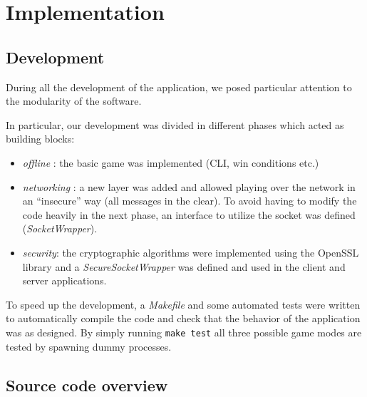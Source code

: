 \section{Implementation}

\subsection{Development}
During all the development of the application, we posed particular attention to the modularity of the software.

In particular, our development was divided in different phases which acted as building blocks:
\begin{itemize}
	\item \textit{offline} : the basic game was implemented (CLI, win conditions etc.)
	\item \textit{networking} : a new layer was added and allowed playing over the network in an ``insecure'' way (all messages in the clear). To avoid having to modify the code heavily in the next phase, an interface to utilize the socket was defined (\emph{SocketWrapper}).
	\item \textit{security}: the cryptographic algorithms were implemented using the OpenSSL library and a \emph{SecureSocketWrapper} was defined and used in the client and server applications.
\end{itemize}

To speed up the development, a \emph{Makefile} and some automated tests were written to automatically compile the code and check that the behavior of the application was as designed. By simply running \texttt{make test} all three 
possible game modes are tested by spawning dummy processes.

\subsection{Source code overview}
\label{ref:modules}

